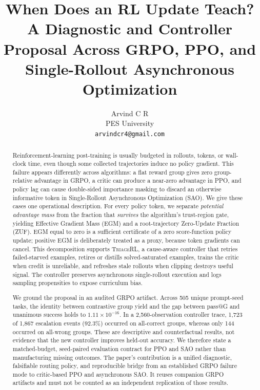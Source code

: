 \documentclass{article}
\title{When Does an RL Update Teach?\\
A Diagnostic and Controller Proposal Across GRPO, PPO, and\\
Single-Rollout Asynchronous Optimization}
\author{Arvind C R\\
PES University\\
\texttt{arvindcr4@gmail.com}}
\newcommand{\method}{\textsc{TriageRL}\xspace}
\begin{document}
\maketitle

\begin{abstract}
Reinforcement-learning post-training is usually budgeted in rollouts, tokens,
or wall-clock time, even though some collected trajectories induce no policy
gradient.  This failure appears differently across algorithms: a flat reward
group gives zero group-relative advantage in GRPO, a critic can produce a
near-zero advantage in PPO, and policy lag can cause double-sided importance
masking to discard an otherwise informative token in Single-Rollout
Asynchronous Optimization (SAO).  We give these cases one operational
description.  For every policy token, we separate \emph{potential advantage
mass} from the fraction that \emph{survives} the algorithm's trust-region
gate, yielding Effective Gradient Mass (EGM) and a root-trajectory
Zero-Update Fraction (ZUF).  EGM equal to zero is a sufficient certificate of
a zero score-function policy update; positive EGM is deliberately treated as
a proxy, because token gradients can cancel.  This decomposition supports
\method, a cause-aware controller that retries failed-starved examples,
retires or distills solved-saturated examples, trains the critic when credit is
unreliable, and refreshes stale rollouts when clipping destroys useful signal.
The controller preserves asynchronous single-rollout execution and logs
sampling propensities to expose curriculum bias.

We ground the proposal in an audited GRPO artifact.  Across 505 unique
prompt-seed tasks, the identity between contrastive group yield and the gap
between pass@G and unanimous success holds to $1.11\times10^{-16}$.  In a
2,560-observation controller trace, 1,723 of 1,867 escalation events (92.3\%)
occurred on all-correct groups, whereas only 144 occurred on all-wrong groups.
These are descriptive and counterfactual results, not evidence that the new
controller improves held-out accuracy.  We therefore state a matched-budget,
seed-paired evaluation contract for PPO and SAO rather than manufacturing
missing outcomes.  The paper's contribution is a unified diagnostic,
falsifiable routing policy, and reproducible bridge from an established GRPO
failure mode to critic-based PPO and asynchronous SAO. It reuses companion GRPO
artifacts and must not be counted as an independent replication of those results.

\end{abstract}
\end{document}
